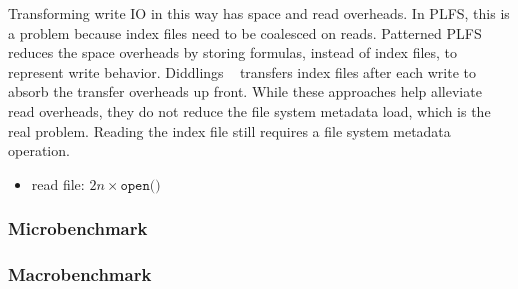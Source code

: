 Transforming write IO in this way has space and read overheads. In PLFS, this
is a problem because index files need to be coalesced on reads.  Patterned
PLFS~\cite{he:hpdc13-plfs-patterns} reduces the space overheads by storing
formulas, instead of index files, to represent write behavior. Diddlings
~\cite{grider:pc17-diddlings} transfers index files after each write to absorb
the transfer overheads up front. While these approaches help alleviate read
overheads, they do not reduce the file system metadata load, which is the real
problem. Reading the index file still requires a file system metadata
operation.

\begin{itemize}
  \item read file: \(2n \times \texttt{open()}\) 
\end{itemize}

\subsubsection{Microbenchmark}
\subsubsection{Macrobenchmark}
